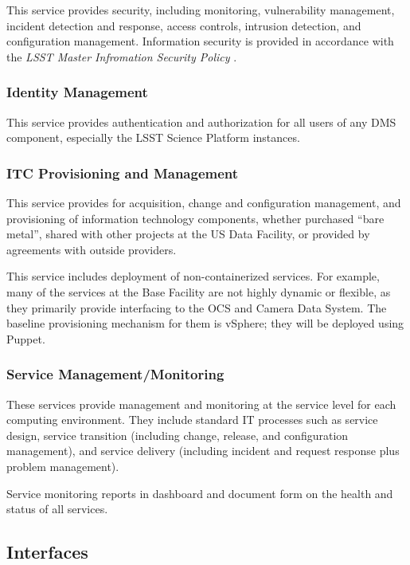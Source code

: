 \documentclass[DM,toc,lsstdraft]{lsstdoc}
\begin{document}
This service provides security, including monitoring, vulnerability management, incident detection and response, access controls, intrusion detection, and configuration management.
Information security is provided in accordance with the \textit{LSST Master Infromation Security Policy} .

\subsubsection{Identity Management}\label{identity-management}

This service provides authentication and authorization for all users of
any DMS component, especially the LSST Science Platform instances.

\subsubsection{ITC Provisioning and Management}\label{itc-provisioning-management}

This service provides for acquisition, change and configuration management, and provisioning of information technology components, whether purchased ``bare metal'', shared with other projects at the US Data Facility, or provided by agreements with outside providers.

This service includes deployment of non-containerized services.
For example, many of the services at the Base Facility are not highly dynamic or flexible, as they primarily provide interfacing to the OCS and Camera Data System.
The baseline provisioning mechanism for them is vSphere; they will be deployed using Puppet.

\subsubsection{Service Management/Monitoring}\label{service-management-monitoring}

These services provide management and monitoring at the service level for each computing environment.
They include standard IT processes such as service design, service transition (including change, release, and configuration management), and service delivery (including incident and request response plus problem management).

Service monitoring reports in dashboard and document form on the health and status of all services.

\subsection{Interfaces}\label{infrastructure-interfaces}
\end{document}
